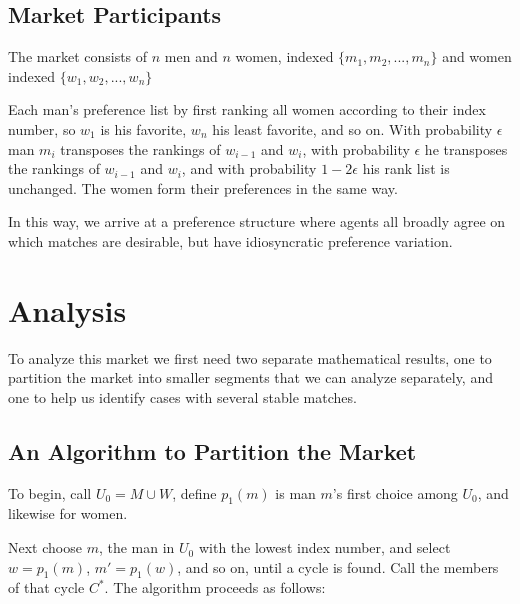 \documentclass[WP]{AEA}
\begin{document}
\subsection{Market Participants}

The market consists of $n$ men and $n$ women,  indexed $\{ m_1, m_2, ... ,m_n\}$ and women indexed $\{ w_1, w_2, ... ,w_n\}$
	
Each man's preference list by first ranking all women according to their index number, so $w_1$ is his favorite, $w_n$ his least favorite, and so on.  
With probability $\epsilon$ man $m_i$ transposes the rankings of $w_{i-1}$ and $w_i$, with probability $\epsilon$ he transposes the rankings of $w_{i-1}$ and $w_i$, and with probability $1-2\epsilon$ his rank list is unchanged.
The women form their preferences in the same way.

In this way, we arrive at a preference structure where agents all broadly agree on which matches are desirable, but have idiosyncratic preference variation.
	

	
\section{Analysis}

To analyze this market we first need two separate mathematical results, one to partition the market into smaller segments that we can analyze separately, and one to help us identify cases with several stable matches.


\subsection{An Algorithm to Partition the Market} \label{subsect:partition}

To begin, call $U_0 = M \cup W$, define $p_1(m)$ is man $m$'s first choice among $U_0$, and likewise for women.

Next choose $m$, the man in $U_0$ with the lowest index number, and select $w = p_1(m)$, $m' = p_1(w)$, and so on, until a cycle is found. Call the members of that cycle $C^*$.  The algorithm proceeds as follows: 
\end{document}
